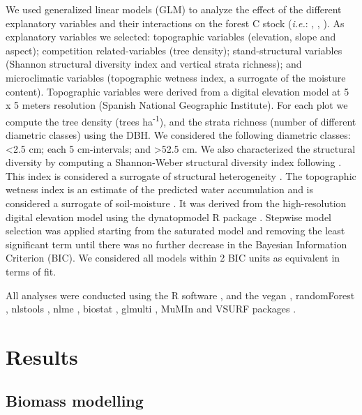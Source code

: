 We used generalized linear models (GLM) to analyze the effect of the different explanatory variables and their interactions on the forest C stock (\emph{i.e.}: \wt, \ws, \wro). As explanatory variables we selected: topographic variables (elevation, slope and aspect); competition related-variables (tree density); stand-structural variables (Shannon structural diversity index and vertical strata richness); and microclimatic variables (topographic wetness index, a surrogate of the moisture content). Topographic variables were derived from a digital elevation model at 5 x 5 meters resolution (Spanish National Geographic Institute). For each plot we compute the tree density (trees ha\textsuperscript{-1}), and the strata richness (number of different diametric classes) using the DBH. We considered the following diametric classes: \textless2.5 cm; each 5 cm-intervals; and \textgreater52.5 cm. We also characterized the structural diversity by computing a Shannon-Weber structural diversity index following \autocite{delRioetal2003IndicesStand}. This index is considered a surrogate of structural heterogeneity \autocite{McElhinnyetal2005ForestWoodland,Gadowetal2012ForestStructure}. The topographic wetness index is an estimate of the predicted water accumulation and is considered a surrogate of soil-moisture \autocites[\emph{e.g.}][]{Zinkoetal2005PlantSpecies,Petrosellietal2013EcologicalBehavior}. It was derived from the high-resolution digital elevation model using the dynatopmodel R package \autocite{Metcalfeetal2018DynatopmodelImplementation}. Stepwise model selection was applied starting from the saturated model and removing the least significant term until there was no further decrease in the Bayesian Information Criterion (BIC). We considered all models within 2 BIC units as equivalent in terms of fit.

All analyses were conducted using the R software \autocite{base}, and the vegan \autocite{vegan}, randomForest \autocite{randomForest}, nlstools \autocite{nlstools}, nlme \autocite{nlme}, biostat \autocite{biostat}, glmulti \autocite{glmulti}, MuMIn \autocite{MuMIn} and VSURF packages \autocite{VSURF}. 

\section{Results}\label{sec:carbon:results}
\subsection{Biomass modelling}\label{sec:carbon:results-modelling}

